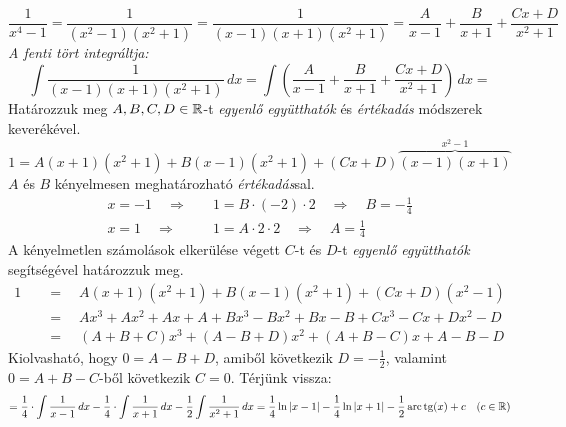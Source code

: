 \documentclass[a4paper,11.5pt]{article}
\DeclareMathOperator{\tg}{tg}
\DeclareMathOperator{\arc}{arc}
\begin{document}
	\begin{exercise}
		\[ \frac{1}{x^4-1}=\frac{1}{(x^2-1)(x^2+1)}=\frac{1}{(x-1)(x+1)(x^2+1)}=\frac{A}{x-1}+\frac{B}{x+1}+\frac{Cx+D}{x^2+1} \]
		\textit{A fenti tört integráltja:}
		\[\int\frac{1}{(x-1)(x+1)(x^2+1)}\,dx=\int\left(\frac{A}{x-1}+\frac{B}{x+1}+\frac{Cx+D}{x^2+1}\right)\,dx= \]
		Határozzuk meg $A,B,C,D\in\mathbb{R}$-t \textit{egyenlő együtthatók} és \textit{értékadás} módszerek keverékével.
		\[ 1=A(x+1)(x^2+1)+B(x-1)(x^2+1)+(Cx+D)\overbrace{(x-1)(x+1)}^{x^2-1} \]
		$A$ és $B$ kényelmesen meghatározható \textit{értékadás}sal.
		\begin{align*}
			x=-1\quad \Rightarrow&\quad 1=B\cdot(-2)\cdot2\quad \Rightarrow\quad B=-\frac{1}{4}\\
			x=1\quad \Rightarrow&\quad 	1=A\cdot 2\cdot 2\quad \Rightarrow\quad A=\frac{1}{4}		
		\end{align*}
		A kényelmetlen számolások elkerülése végett $C$-t és $D$-t \textit{egyenlő együtthatók} segítségével határozzuk meg.
		\begin{align*}
			1\quad &=\quad A(x+1)(x^2+1)+B(x-1)(x^2+1)+(Cx+D)(x^2-1)\\
				   &=\quad Ax^3+Ax^2+Ax+A+Bx^3-Bx^2+Bx-B+Cx^3-Cx+Dx^2-D\\
				   &=\quad (A+B+C)x^3+(A-B+D)x^2+(A+B-C)x+A-B-D
		\end{align*}
		Kiolvasható, hogy $0=A-B+D$, amiből következik $D=-\frac{1}{2}$, valamint $0=A+B-C$-ből következik $C=0$. Térjünk vissza:
		\[ =\frac{1}{4}\cdot\int\frac{1}{x-1}\,dx-\frac{1}{4}\cdot\int\frac{1}{x+1}\,dx-\frac{1}{2}\int\frac{1}{x^2+1}\,dx=\frac{1}{4}\ln|x-1|-\frac{1}{4}\ln|x+1|-\frac{1}{2}\arc\tg(x)+c\quad (c\in\R) \]
	\end{exercise}
\end{document}
